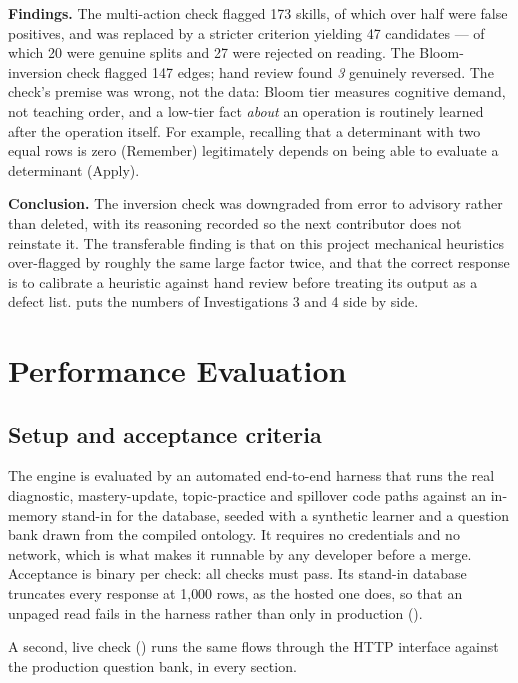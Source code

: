 \textbf{Findings.} The multi-action check flagged 173 skills, of which over half
were false positives, and was replaced by a stricter criterion yielding 47
candidates --- of which 20 were genuine splits and 27 were rejected on reading.
The Bloom-inversion check flagged 147 edges; hand review found \emph{3}
genuinely reversed. The check's premise was wrong, not the data: Bloom tier
measures cognitive demand, not teaching order, and a low-tier fact \emph{about}
an operation is routinely learned after the operation itself. For example,
recalling that a determinant with two equal rows is zero (Remember) legitimately
depends on being able to evaluate a determinant (Apply).

\textbf{Conclusion.} The inversion check was downgraded from error to advisory
rather than deleted, with its reasoning recorded so the next contributor does not
reinstate it. The transferable finding is that on this project mechanical
heuristics over-flagged by roughly the same large factor twice, and that the
correct response is to calibrate a heuristic against hand review before treating
its output as a defect list.  puts the numbers of
Investigations 3 and 4 side by side.



\section{Performance Evaluation}
\label{sec:evaluation}

\subsection{Setup and acceptance criteria}

The engine is evaluated by an automated end-to-end harness that runs the real
diagnostic, mastery-update, topic-practice and spillover code paths against an
in-memory stand-in for the database, seeded with a synthetic learner and a
question bank drawn from the compiled ontology. It requires no credentials and
no network, which is what makes it runnable by any developer before a merge.
Acceptance is binary per check: all checks must pass. Its stand-in database
truncates every response at 1{,}000 rows, as the hosted one does, so that an
unpaged read fails in the harness rather than only in production
().

A second, live check () runs the same flows through the
HTTP interface against the production question bank, in every section.

